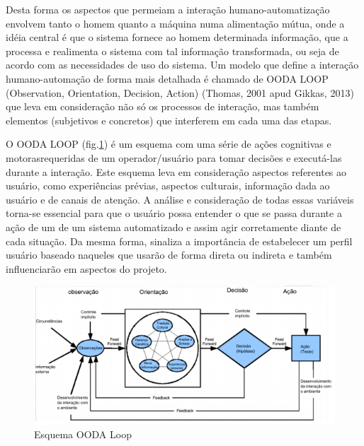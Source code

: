 \documentclass[12pt,a4paper]{article}
\begin{document}
Desta forma os aspectos que permeiam a interação humano-automatização envolvem tanto o homem quanto a máquina numa alimentação mútua, 
onde a idéia central é que o sistema fornece ao homem determinada informação, que a processa e realimenta o sistema com tal informação 
transformada, ou seja de acordo com as necessidades de uso do sistema. 
Um modelo que define a interação humano-automação de forma mais detalhada é chamado de OODA LOOP (Observation, Orientation, Decision, Action) 
(Thomas, 2001 apud Gikkas, 2013) que leva em consideração não só os processos de interação, mas também elementos (subjetivos e concretos) que 
interferem em cada uma das etapas. 

O OODA LOOP (fig.\ref{fig:ooda}) é um esquema com uma série de ações
cognitivas e motorasrequeridas de um operador/usuário para tomar decisões e executá-las durante a interação. Este esquema leva em consideração aspectos referentes ao usuário, como experiências prévias, aspectos culturais, informação 
dada ao usuário e de canais de atenção. A análise e consideração de todas essas variáveis torna-se essencial para que o usuário possa entender o 
que se passa durante a ação de um de um sistema automatizado e assim agir corretamente diante de cada situação. Da mesma forma, sinaliza a 
importância de estabelecer um perfil usuário baseado naqueles que usarão de forma direta ou indireta e também influenciarão em aspectos do projeto.

\begin{figure}[h!]
\begin{center}
  \includegraphics[width=\columnwidth]{figs/ooda_loop.png}
  \caption{Esquema OODA Loop}
  \label{fig:ooda}
\end{center}
\end{figure} 
 
\end{document}
